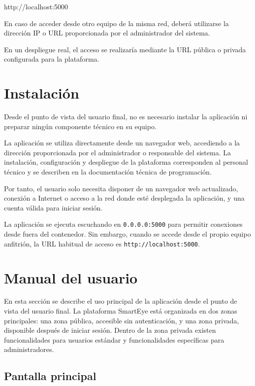 \begin{bloqueCodigo}[title={url de acceso}]
	http://localhost:5000
\end{bloqueCodigo}

En caso de acceder desde otro equipo de la misma red, deberá utilizarse la dirección IP o URL proporcionada por el administrador del sistema.

En un despliegue real, el acceso se realizaría mediante la URL pública o privada configurada para la plataforma.

\section{Instalación}

Desde el punto de vista del usuario final, no es necesario instalar la aplicación ni preparar ningún componente técnico en su equipo.

La aplicación se utiliza directamente desde un navegador web, accediendo a la dirección proporcionada por el administrador o responsable del sistema. La instalación, configuración y despliegue de la plataforma corresponden al personal técnico y se describen en la documentación técnica de programación.

Por tanto, el usuario solo necesita disponer de un navegador web actualizado, conexión a Internet o acceso a la red donde esté desplegada la aplicación, y una cuenta válida para iniciar sesión.

La aplicación se ejecuta escuchando en \texttt{0.0.0.0:5000} para permitir conexiones desde fuera del contenedor. Sin embargo, cuando se accede desde el propio equipo anfitrión, la URL habitual de acceso es \texttt{http://localhost:5000}.

\section{Manual del usuario}

En esta sección se describe el uso principal de la aplicación desde el punto de vista del usuario final. La plataforma SmartEye está organizada en dos zonas principales: una zona pública, accesible sin autenticación, y una zona privada, disponible después de iniciar sesión. Dentro de la zona privada existen funcionalidades para usuarios estándar y funcionalidades específicas para administradores.

\subsection{Pantalla principal}


